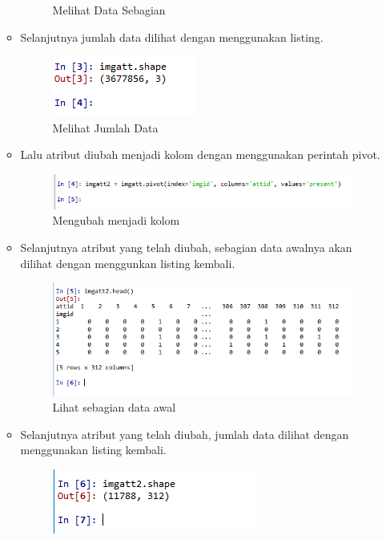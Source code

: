 \begin{enumerate}
\begin{itemize}
\begin{figure}[ht]
			\caption{Melihat Data Sebagian}
			\label{contoh}
			\end{figure}
		\item Selanjutnya jumlah data dilihat dengan menggunakan listing.
			\begin{figure}[ht]
			\centering
			\includegraphics[scale=0.5]{figures/AIP/ai9.PNG}
			\caption{Melihat Jumlah Data}
			\label{contoh}
			\end{figure}
		\item Lalu atribut diubah menjadi kolom dengan menggunakan perintah pivot.
			\begin{figure}[ht]
			\centering
			\includegraphics[scale=0.5]{figures/AIP/ai10.PNG}
			\caption{Mengubah menjadi kolom}
			\label{contoh}
			\end{figure}
		\item Selanjutnya atribut yang telah diubah, sebagian data awalnya akan dilihat dengan menggunkan listing kembali.
			\begin{figure}[ht]
			\centering
			\includegraphics[scale=0.5]{figures/AIP/ai11.PNG}
			\caption{Lihat sebagian data awal}
			\label{contoh}
			\end{figure}
		\item Selanjutnya atribut yang telah diubah, jumlah data dilihat dengan menggunakan listing kembali.
			\begin{figure}[ht]
			\centering
			\includegraphics[scale=0.5]{figures/AIP/ai12.PNG}

\end{figure}
\end{itemize}
\end{enumerate}
